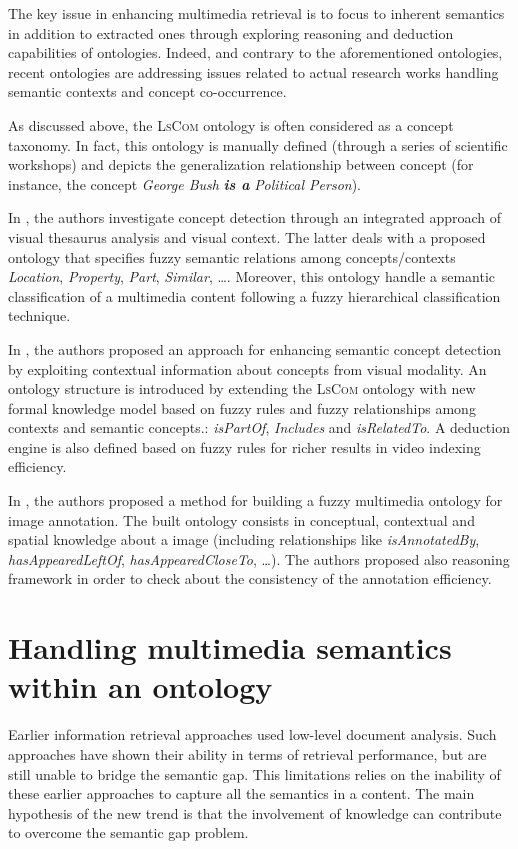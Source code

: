 	The key issue in enhancing multimedia retrieval is to focus to inherent semantics in addition to extracted
	ones through exploring reasoning and deduction capabilities of ontologies. Indeed, and contrary to 
	the aforementioned ontologies, recent ontologies are addressing issues related to actual research 
	works handling semantic contexts and concept co-occurrence. 

	As discussed above, the \textsc{LsCom} ontology \citep{Naphade2006} is often considered as a concept 
	taxonomy. In fact, this ontology is manually defined (through a series of scientific workshops)
	and depicts the generalization relationship between concept (for instance, the concept 
	\emph{George Bush} \textbf{\textit{is a}} \emph{Political Person}).

	In \citep{Mylonas2008,Mylonas2009}, the authors investigate concept detection through an integrated
	approach of visual thesaurus analysis and visual context. The latter deals with a proposed ontology
	that specifies fuzzy semantic relations among concepts/contexts \emph{Location}, \emph{Property},
	\emph{Part}, \emph{Similar}, \dots{}. Moreover, this ontology handle a semantic classification of
	a multimedia content following a fuzzy hierarchical classification technique.

	In \citep{Elleuch2011}, the authors proposed an approach for enhancing semantic concept detection
	by exploiting contextual information about concepts from visual modality. An ontology structure is
	introduced by extending the \textsc{LsCom} ontology with new formal knowledge model based on fuzzy
	rules and fuzzy relationships among contexts and semantic concepts.: \emph{isPartOf}, \emph{Includes}
	and \emph{isRelatedTo}. A deduction engine is also defined based on fuzzy rules for richer results
	in video indexing efficiency.

	In \citep{Bannour2013}, the authors proposed a method for building a fuzzy multimedia ontology
	for image annotation. The built ontology consists in conceptual, contextual and spatial
	knowledge about a image (including relationships like \emph{isAnnotatedBy}, \emph{hasAppearedLeftOf},
	\emph{hasAppearedCloseTo}, \dots{}). The authors proposed also reasoning framework in order to check
	about the consistency of the annotation efficiency.

\section{Handling multimedia semantics within an ontology}
	Earlier information retrieval approaches used low-level document analysis. Such approaches have shown 
	their ability in terms of retrieval performance, but are still unable to bridge the semantic gap. This 
	limitations relies on the inability of these earlier approaches to capture all the semantics in a 
	content. The main hypothesis of the new trend is that the involvement of knowledge can contribute to
	overcome the semantic gap problem. 

